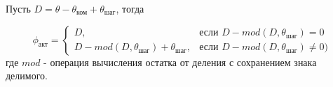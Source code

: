 Пусть $D = \theta - \theta_\textit{ком} + \theta_\textit{шаг}$, тогда

\begin{equation}
    \label{sync_restore_negat_dir_active_pole_pos}
    \phi_\textit{акт} =
        \begin{cases}
            D,                                                      & \mbox{если } D - mod(D, \theta_\textit{шаг}) = 0 \\
            D - mod(D, \theta_\textit{шаг}) + \theta_\textit{шаг},  & \mbox{если } D - mod(D, \theta_\textit{шаг}) \ne 0)
        \end{cases}
\end{equation}
где $mod$ - операция вычисления остатка от деления с сохранением знака делимого.
